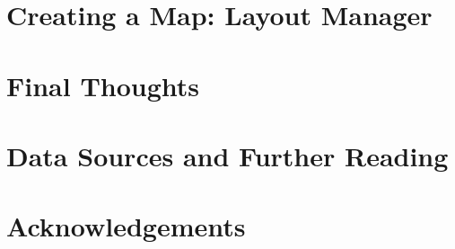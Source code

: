 \documentclass{article}
\begin{document}
\section{Creating a Map: Layout Manager}

\section{Final Thoughts}

\section{Data Sources and Further Reading}

\section{Acknowledgements}

\newpage
\printbibliography
\end{document}
